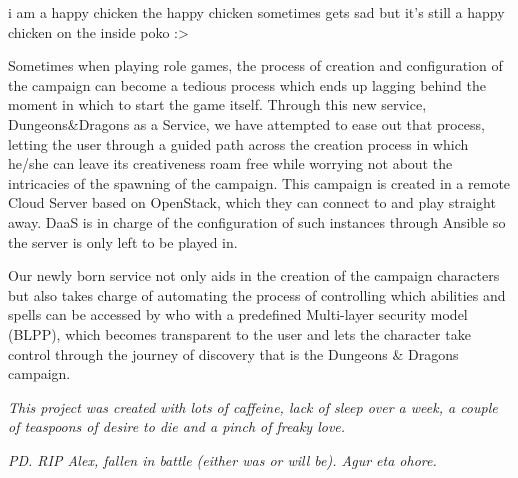 \documentclass[a4paper,12pt]{report}
\begin{document}
i am a happy chicken
the happy chicken sometimes gets sad
but it's still a happy chicken on the inside
poko :>

Sometimes when playing role games, the process of creation and configuration of the campaign can become a tedious process which ends up lagging behind the moment in which to start the game itself. Through this new service, Dungeons\&Dragons as a Service, we have attempted to ease out that process, letting the user through a guided path across the creation process in which he/she can leave its creativeness roam free while worrying not about the intricacies of the spawning of the campaign. This campaign is created in a remote Cloud Server based on OpenStack, which they can connect to and play straight away. DaaS is in charge of the configuration of such instances through Ansible so the server is only left to be played in.

Our newly born service not only aids in the creation of the campaign characters but also takes charge of automating the process of controlling which abilities and spells can be accessed by who with a predefined Multi-layer security model (BLPP), which becomes transparent to the user and lets the character take control through the journey of discovery that is the Dungeons \& Dragons campaign.



\vskip 8cm

\textit{This project was created with lots of caffeine, lack of sleep over a week, a couple of teaspoons of desire to die and a pinch of freaky love.}

\textit{PD. RIP Alex, fallen in battle (either was or will be). Agur eta ohore.}
\end{document}
